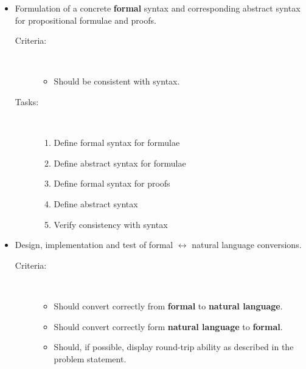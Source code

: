\documentclass[a4paper]{article}
\begin{document}
\begin{itemize}
\item
    Formulation of a concrete {\bf formal} syntax and corresponding abstract
    syntax for propositional formulae and proofs.
    \begin{description}
        \item[Criteria:]~ \\ \vspace{-5 mm}
            \begin{itemize}
                \item Should be consistent with \cite{box}
                syntax.
            \end{itemize}
        \item[Tasks:]~ \\ \vspace{-5 mm}
            \begin{enumerate}[\HollowBox]
               \item Define formal syntax for formulae
               \item Define abstract syntax for formulae
               \item Define formal syntax for proofs
               \item Define abstract syntax
               \item Verify consistency with  syntax
            \end{enumerate}
    \end{description}

\item
    Design, implementation and test of formal $\longleftrightarrow$ natural
    language conversions.
    \begin{description}
        \item[Criteria:]~ \\ \vspace{-5 mm}
            \begin{itemize}
                \item Should convert correctly from {\bf formal} to
                {\bf natural language}.
                \item Should convert correctly form {\bf natural language}
                to {\bf formal}.
                \item Should, if possible, display round-trip ability as
                described in the problem statement.
            \end{itemize}
    \end{description}


\end{itemize}
\end{document}
